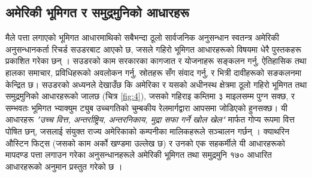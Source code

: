 \documentclass[10pt,twocolumn,letterpaper]{article}
\begin{document}
\subsection{अमेरिकी भूमिगत र समुद्रमुनिको आधारहरू}

मैले पत्ता लगाएको भूमिगत आधारमाथिको सबैभन्दा ठूलो सार्वजनिक अनुसन्धान स्वतन्त्र अमेरिकी अनुसन्धानकर्ता रिचर्ड सउडरबाट आएको छ, जसले गहिरो भूमिगत आधारहरूको विषयमा धेरै पुस्तकहरू प्रकाशित गरेका छन् \cite{22}। सउडरको काम सरकारका कागजात र योजनाहरू सङ्कलन गर्नु, ऐतिहासिक तथा हालका समाचार, प्रविधिहरूको अवलोकन गर्नु, स्रोतहरू सँग संवाद गर्नु, र भित्री दावीहरूको सङकलनमा केन्द्रित छ। सउडरको अध्यनले देखाउँछ कि अमेरिका र यसको अधीनस्थ क्षेत्रमा ठूलो गहिरो भूमिगत तथा समुद्रमुनिको आधारहरूको जालछ (चित्र \ref{fig:4}), जसको गहिराइ कम्तिमा ३ माइलसम्म पुग्न सक्छ, र सम्भवतः भूमिगत भ्याक्युम ट्युब उच्चगतिको चुम्बकीय रेलमार्गद्वारा आपसमा जोडिएको हुनसक्छ। यी आधारहरू \textit{"उच्च वित्त, अन्तर्राष्ट्रिय, अन्तरनिकाय, मुद्रा सफा गर्ने खोल खेल"} मार्फत गोप्य रूपमा वित्त पोषित छन्, जसलाई संयुक्त राज्य अमेरिकाको कम्पनीका मालिकहरूले सञ्चालन गर्छन् \cite{22}। क्याथरिन औस्टिन फिट्स (जसको काम अर्को खण्डमा उल्लेख छ) र उनको एक सहकर्मीले यी आधारहरूको मापदण्ड पत्ता लगाउन गरेका अनुसन्धानहरूले अमेरिकी भूमिगत तथा समुद्रमुनि १७० आधारित आधारहरूको अनुमान प्रस्तुत गरेको छ \cite{16,20}।
\end{document}
